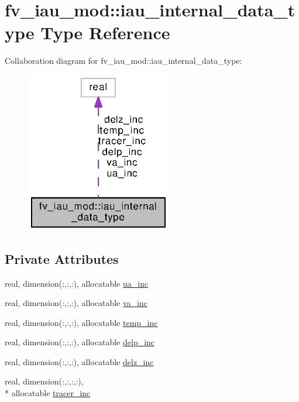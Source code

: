 \section{fv\-\_\-iau\-\_\-mod\-:\-:iau\-\_\-internal\-\_\-data\-\_\-type Type Reference}
\label{structfv__iau__mod_1_1iau__internal__data__type}


Collaboration diagram for fv\-\_\-iau\-\_\-mod\-:\-:iau\-\_\-internal\-\_\-data\-\_\-type\-:
\nopagebreak
\begin{figure}[H]
\begin{center}
\leavevmode
\includegraphics[width=180pt]{structfv__iau__mod_1_1iau__internal__data__type__coll__graph}
\end{center}
\end{figure}
\subsection*{Private Attributes}
\begin{DoxyCompactItemize}
\item 
real, dimension(\-:,\-:,\-:), allocatable \hyperlink{structfv__iau__mod_1_1iau__internal__data__type_ae53005a7a5bfd2b26151297ccad01589}{ua\-\_\-inc}
\item 
real, dimension(\-:,\-:,\-:), allocatable \hyperlink{structfv__iau__mod_1_1iau__internal__data__type_abf93781f5201e7988f4fb02023067d1c}{va\-\_\-inc}
\item 
real, dimension(\-:,\-:,\-:), allocatable \hyperlink{structfv__iau__mod_1_1iau__internal__data__type_a515361138aa772aba2c0471c5c7c3be7}{temp\-\_\-inc}
\item 
real, dimension(\-:,\-:,\-:), allocatable \hyperlink{structfv__iau__mod_1_1iau__internal__data__type_ada9bf234b0fa3681403c4ca5bc9411e3}{delp\-\_\-inc}
\item 
real, dimension(\-:,\-:,\-:), allocatable \hyperlink{structfv__iau__mod_1_1iau__internal__data__type_a98f0a840a25adcc48aaef5658045d0e7}{delz\-\_\-inc}
\item 
real, dimension(\-:,\-:,\-:,\-:), \\*
allocatable \hyperlink{structfv__iau__mod_1_1iau__internal__data__type_a891ea56d404a70616d629be467f53f2a}{tracer\-\_\-inc}
\end{DoxyCompactItemize}


